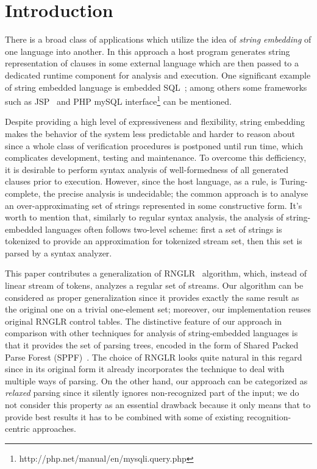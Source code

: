 \section*{Introduction}
There is a broad class of applications which utilize the idea of \emph{string embedding} of one 
language into another. In this approach a host program generates string representation of 
clauses in some external language which are then passed to a dedicated runtime 
component for analysis and execution. One significant example of string embedded 
language is embedded SQL~\cite{DSQLISO}; among others some frameworks 
such as JSP~\cite{JSP} and PHP mySQL interface\footnote{http://php.net/manual/en/mysqli.query.php} 
can be mentioned.

Despite providing a high level of expressiveness and flexibility, string embedding makes the 
behavior of the system less predictable and harder to reason about since a whole class of 
verification procedures is postponed until run time, which complicates development, 
testing and maintenance. To overcome this defficiency, it is desirable to perform syntax 
analysis of well-formedness of all generated clauses prior to execution. However, since the 
host language, as a rule, is Turing-complete, the precise analysis is undecidable; the common 
approach is to analyse an over-approximating set of strings represented in some constructive form. 
It's worth to mention that, similarly to regular syntax analysis, the analysis of string-embedded 
languages often follows two-level scheme: first a set of strings is tokenized to provide an 
approximation for tokenized stream set, then this set is parsed by a syntax analyzer.

This paper contributes a generalization of RNGLR~\cite{RNGLR} algorithm, which, instead of
linear stream of tokens, analyzes a regular set of streams. Our algorithm can be considered as
proper generalization since it provides exactly the same result as the original one on a
trivial one-element set; moreover, our implementation reuses original RNGLR control tables. The distinctive 
feature of our approach in comparison with other techniques for analysis of string-embedded 
languages is that it provides the set of parsing trees, encoded in the form of Shared Packed 
Parse Forest (SPPF)~\cite{SPPF}. The choice of RNGLR looks quite natural in this regard
since in its original form it already incorporates the technique to deal with multiple
ways of parsing. On the other hand, our approach can be categorized as \emph{relaxed} 
parsing since it silently ignores non-recognized part of the input; we do not consider this 
property as an essential drawback because it only means that to provide best results
it has to be combined with some of existing recognition-centric approaches.
